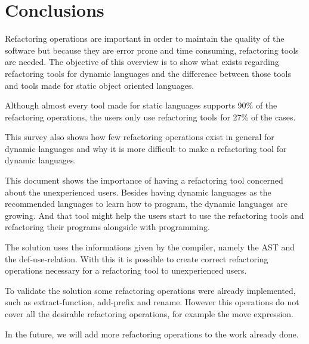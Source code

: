 
% 
% 

\section{Conclusions}


Refactoring operations are important in order to maintain the quality of the software but because they are error prone and time consuming, refactoring tools are needed.
The objective of this overview is to show what exists regarding refactoring tools for dynamic languages and the difference between those tools and tools made for static object oriented languages.


Although almost every tool made for static languages supports 90\% of the refactoring operations, the users only use refactoring tools for 27\% of the cases. %

This survey also shows how few refactoring operations exist in general for dynamic languages and why it is more difficult to make a refactoring tool for dynamic languages.

This document shows the importance of having a refactoring tool concerned about the unexperienced users. 
Besides having dynamic languages as the recommended languages to learn how to program, the dynamic languages are growing. 
And that tool might help the users start to use the refactoring tools and refactoring their programs alongside with programming.

The solution uses the informations given by the compiler, namely the AST and the def-use-relation. With this it is possible to create correct refactoring operations necessary for a refactoring tool to unexperienced users.

To validate the solution some refactoring operations were already implemented, such as extract-function, add-prefix and rename. However this operations do not cover all the desirable refactoring operations, for example the move expression.

In the future, we will add more refactoring operations to the work already done.